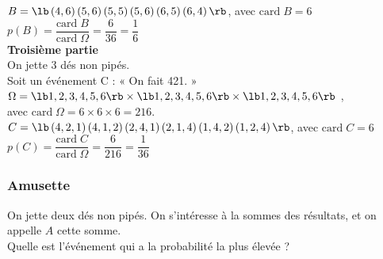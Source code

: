 $B = \lb \left(4,6\right) \left(5,6\right) \left(5,5\right) \left(5,6\right) \left(6,5\right) \left(6,4\right) \rb $, avec $\mathrm{card} \; B = 6 $ \\

$p\left(B\right) = \dfrac{\mathrm{card} \; B}{\mathrm{card} \; \Omega} = \dfrac{6}{36} = \dfrac{1}{6} $ \\

\textbf{Troisième partie} \\

On jette 3 dés non pipés. \\ Soit un événement C : « On fait 421. » \\

$\Omega = \lb 1,2,3,4,5,6 \rb \times \lb 1,2,3,4,5,6 \rb \times \lb 1,2,3,4,5,6 \rb$ , \\ avec $\mathrm{card} \; \Omega = 6 \times 6 \times 6 = 216$. \\

$C = \lb \left(4,2,1\right) \left(4,1,2\right) \left(2,4,1\right) \left(2,1,4\right) \left(1,4,2\right) \left(1,2,4\right) \rb $, avec $\mathrm{card} \; C = 6 $ \\

$p\left(C\right) = \dfrac{\mathrm{card} \; C}{\mathrm{card} \; \Omega} = \dfrac{6}{216} = \dfrac{1}{36} $ \\

\newpage

\subsubsection{Amusette }

On jette deux dés non pipés. On s'intéresse à la sommes des résultats, et on appelle $A$ cette somme. \\ Quelle est l'événement qui a la probabilité la plus élevée ? \\


